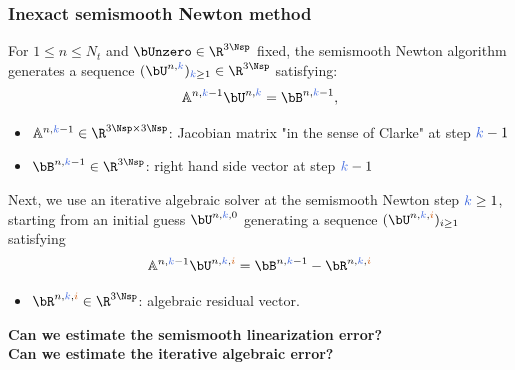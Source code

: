 \documentclass[10 pt]{beamer}
\begin{document}
\begin{frame}
 \frametitle{Inexact semismooth Newton method}
 For $1 \leq n \leq N_t$ and $\bUnzero \in \R^{3 \Nsp}$ fixed, the semismooth Newton algorithm generates a sequence  $(\bU^{n,\kk})_{\kk\geq 1} \in \R^{3 \Nsp}$ satisfying:
 \begin{equation*}
 \mathbb{A}^{n,\kk-1}\bU^{n,\kk}=\bB^{n,\kk-1},
 \end{equation*}
\vspace{-0.6 cm}
 \begin{itemize}
 \item
 $\mathbb{A}^{n,\kk-1} \in \R^{3 \Nsp \times 3 \Nsp}$: Jacobian matrix "in the sense of Clarke" at step $\kk-1$\\
 \item
 $\bB^{n,\kk-1} \in \R^{3 \Nsp}$: right hand side vector at step $\kk-1$
 \end{itemize}
 \vspace{0.3 cm}
 Next, we use an iterative algebraic solver at the semismooth Newton step $\kk \geq 1$, starting from an initial guess $\bU^{n,\kk,0}$ generating a sequence $(\bU^{n,\kk,\ii})_{i \geq 1}$ satisfying
 \begin{equation*}
 \mathbb{A}^{n,\kk-1}\bU^{n,\kk,\ii}=\bB^{n,\kk-1} - \bR^{n,\kk,\ii}
 \end{equation*}
\vspace{-0.6 cm}
 \begin{itemize}
 \item  $\bR^{n,\kk,\ii} \in \R^{3 \Nsp} $: algebraic residual vector.
 \end{itemize}
\vspace{0.2 cm}
\textcolor{cadmiumgreen}{\textbf{Can we estimate the semismooth linearization error?}} \\
\vspace{0.3 cm}
\textcolor{cadmiumgreen}{\textbf{Can we estimate the iterative algebraic error?}}
 \end{frame}
\end{document}

